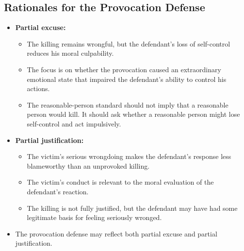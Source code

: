 \documentclass[11pt]{tex/lawoutline}
\begin{document}
\subsection{Rationales for the Provocation Defense}

\begin{itemize}
    \item \textbf{Partial excuse:}
    \begin{itemize}
        \item The killing remains wrongful, but the defendant's loss of self-control reduces his moral culpability.
        \item The focus is on whether the provocation caused an extraordinary emotional state that impaired the defendant's ability to control his actions.
        \item The reasonable-person standard should not imply that a reasonable person would kill. It should ask whether a reasonable person might lose self-control and act impulsively.
    \end{itemize}

    \item \textbf{Partial justification:}
    \begin{itemize}
        \item The victim's serious wrongdoing makes the defendant's response less blameworthy than an unprovoked killing.
        \item The victim's conduct is relevant to the moral evaluation of the defendant's reaction.
        \item The killing is not fully justified, but the defendant may have had some legitimate basis for feeling seriously wronged.
    \end{itemize}

    \item The provocation defense may reflect both partial excuse and partial justification.
\end{itemize}
\end{document}
